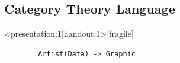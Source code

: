 \documentclass[xcolor={dvipsnames}]{beamer}
\begin{document}

\subsection{Category Theory Language}
\begin{frame}<presentation:1|handout:1>[fragile]{}
    \begin{verbatim}
        Artist(Data) -> Graphic
    \end{verbatim}
\end{frame}
\end{document}
